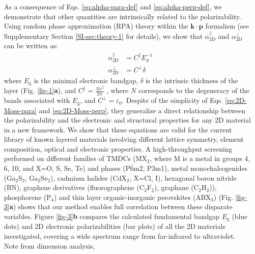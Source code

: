 \documentclass[journal=ancac3,manuscript=article,email=true,hyperref=true,keywords=false]{achemso}
\begin{document}
As a consequence of Eqs. \ref{eq:alpha-para-def} and
\ref{eq:alpha-perp-def}, we demonstrate that other quantities are
intrinsically related to the polarizability.  Using random phase
approximation (RPA) theory \cite{Adler_1962} within the
$\mathbf{k} \cdot \mathbf{p}$ formalism\cite{kittel_2005_introduction}
(see Supplementary Section \ref{SI-sec:theory-1} for details), we show
that $\alpha_{\mathrm{2D}}^{\parallel}$ and
$\alpha_{\mathrm{2D}}^{\perp}$ can be written as:
\begin{subequations}
\begin{eqnarray}
\label{eq:2D-Moss-para}
  &\alpha_{\mathrm{2D}}^{\parallel} &=C^{\parallel} E_{g}^{-1} \\
  \label{eq:2D-Moss-perp}
  &\alpha_{\mathrm{2D}}^{\perp} & =C^{\perp} \delta
\end{eqnarray}
\end{subequations}
where $E_{\mathrm{g}}$ is the minimal electronic bandgap, $\delta$ is
the intrinsic thickness of the layer (Fig. \ref{fig-1}{\textbf a}), and
$C^{\parallel} = {\displaystyle \frac{Ne^2}{2 \pi}}$ \cite{Jiang_2017_Eg_Eb}, where
$N$ corresponds to the degeneracy of the bands associated with
$E_{\mathrm{g}}$, and $C^{\perp} = {\varepsilon_{0}}$.
Despite of the simplicity of Eqs. \ref{eq:2D-Moss-para} and
\ref{eq:2D-Moss-perp}, they generalize a direct relationship between
the polarizability and the electronic and structural properties for
any 2D material in a new framework.  We show that these equations are
valid for the current library of known layered materials involving
different lattice symmetry, element composition, optical and
electronic properties.
%
A high-throughput screening performed on different families of TMDCs
(MX\(_{\text{2}}\), where M is a metal in groups 4, 6, 10, and X=O, S,
Se, Te) and phases (P\(\bar{6}\)m2, P3m1), metal monochalcogenides
(Ga$_{2}$S$_{2}$, Ga$_{2}$Se$_{2}$), cadmium halides (CdX$_2$, X=Cl,
I), hexagonal boron nitride (BN), graphene derivatives (fluorographene
(C$_{2}$F$_{2}$), graphane (C$_{2}$H$_{2}$)), phosphorene (P$_{4}$)
and thin layer organic-inorganic perovskites (ABX$_{3}$)
(Fig. \ref{fig-3}{\textbf a}) shows that our method enables full
correlation between these disparate variables.  Figure
\ref{fig-3}{\textbf b} compares the calculated fundamental bandgap
$E_{\mathrm{g}}$ (blue dots) and 2D electronic polarizabilities (bar
plots) of all the 2D materials investigated, covering a wide spectrum
range from far-infrared to ultraviolet.  Note from dimension analysis,
\end{document}
